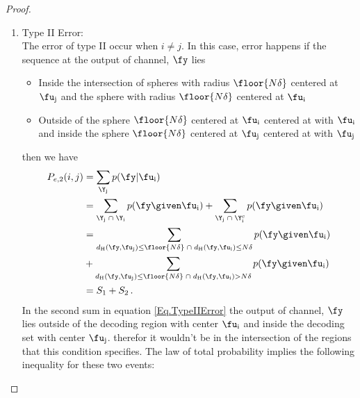 \begin{proof}
\begin{itemize}
\begin{enumerate}
\begin{align}
\end{align}
Now with the inequalities \eqref{upperboundtype1} and \eqref{Eqfloor1} we obtain 
\begin{align}
\label{Eq-typeI}
 \sum_{k=\floor{N\delta}+1}^{N} \binom{N}{t} \epsilon^t (1-\epsilon)^{N-t} \leq \frac{\left(\delta+\frac{1}{N}\right)\frac{(1-\epsilon)}{N}}{\delta - \epsilon} 2^{-N\left[T_\epsilon\left(\frac{\floor{N\delta}+1}{N}\right)-H\left(\frac{\floor{N\delta}+1}{N}\right)\right]} \,.\,
\end{align}
Since  $T_\epsilon(\frac{\floor{N\delta}+1}{N})-H(\frac{\floor{N\delta}+1}{N})>0$ and $\delta > \epsilon$ the upper bound goes towards zero as N goes towards infinity. Thus the proof for type I error is complete.
        \item Type II Error: \\
        The error of type II occur when $i\neq j$. In this case, error happens if the sequence at the output of channel, $\fy$ lies 
        \begin{itemize}
            \item Inside the intersection of spheres with radius $\floor{N\delta}$ centered at $\fu_{\text{j}}$ and the sphere with radius $\floor{N\delta}$ centered at $\fu_{\text{i}}$
            \item Outside of the sphere $\floor{N\delta}$ centered at $\fu_{\text{i}}$ centered at with $\fu_{\text{i}}$ and inside the sphere $\floor{N\delta}$ centered at $\fu_{\text{j}}$ centered at with $\fu_{\text{j}}$
        \end{itemize}  
then we have
\begin{align}
   P_{e,2}(i,j) &= \sum_{\Y_{\text{j}}} p(\fy|\fu_{\text{i}})
   \nonumber
   \\
   \label{Eq.TypeIIError}
   &= \sum_{\Y_{\text{j}} \; \cap \; \Y_{\text{i}}} p(\fy \given \fu_{\text{i}}) +  \sum_{\Y_{\text{j}} \; \cap \; \Y_{\text{i}}^c} p(\fy \given \fu_{\text{i}})
   \nonumber
   \\
  &= \sum_{d_{\text{H}}(\fy,\fu_{\text{j}}) \leq \floor{N\delta} \;\cap \; d_{\text{H}}(\fy,\fu_{\text{i}}) \leq N\delta} p(\fy \given \fu_{\text{i}}) 
  \nonumber\\
  & + \sum_{d_{\text{H}}(\fy,\fu_{\text{j}}) \leq \floor{N\delta} \;\cap \; d_{\text{H}}(\fy,\fu_{\text{i}}) > N\delta} p(\fy \given \fu_{\text{i}})
  \nonumber
   \\
    &= S_1+S_2\,.\,
\end{align}
In the second sum in equation \eqref{Eq.TypeIIError} the output of channel, $\fy$ lies outside of the decoding region with center $\fu_{\text{i}}$ and inside the decoding set with center $\fu_{\text{j}}$. therefor it wouldn't be in the intersection of the regions that this condition specifies. \newline The law of total probability implies the following inequality for these two events:

\end{enumerate}
\end{itemize}
\end{proof}
